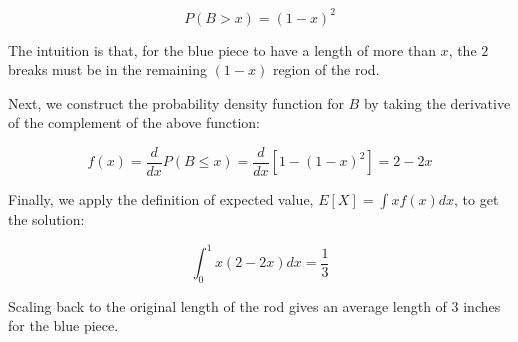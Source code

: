 \documentclass{article}
\begin{document}
$$P(B > x) = (1-x)^2$$

The intuition is that, for the blue piece to have a 
length of more than $x$, the $2$ breaks must be in the 
remaining $(1-x)$ region of the rod.

Next, we construct the probability density function for $B$ by 
taking the derivative of the complement of the above function:

$$f(x) = \dfrac{d}{dx}P(B \leq x) = \dfrac{d}{dx} 
\left[1 - (1-x)^2 \right] = 2-2x$$

Finally, we apply the definition of expected value, 
$E[X] = \int xf(x)dx$, to get the solution:

$$\int_0^1 x(2-2x)dx = \frac{1}{3}$$

Scaling back to the original length of the rod gives an average 
length of $3$ inches for the blue piece.
\end{document}
